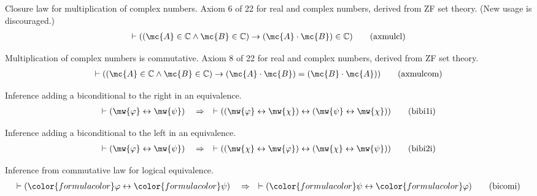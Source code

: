 \begin{lemma} {Closure law for multiplication of complex
numbers.}  Axiom 6 of 22 for
       real and complex numbers, derived from ZF set theory.  
       (New usage is discouraged.)
\begin{align}
\vdash ( ( \mc{A} \in \mathbb{C} \wedge \mc{B} \in \mathbb{C} ) \rightarrow ( \mc{A} \cdot \mc{B} )
    \in \mathbb{C} )\label{eq:axmulcl}\tag{axmulcl}
\end{align}
\end{lemma}


\begin{lemma} {Multiplication of complex numbers is
commutative.}  Axiom 8 of 22 for
       real and complex numbers, derived from ZF set theory.  
\begin{align}
\vdash ( ( \mc{A} \in \mathbb{C} \wedge \mc{B} \in \mathbb{C} ) \rightarrow ( \mc{A} \cdot \mc{B} )
    = ( \mc{B} \cdot \mc{A} ) )\label{eq:axmulcom}\tag{axmulcom}
\end{align}
\end{lemma}


\begin{lemma} {Inference adding a biconditional to the
right in an equivalence.}
\begin{align}
\vdash ( \mw{\varphi} \leftrightarrow \mw{\psi} )\quad\Rightarrow\quad \vdash ( ( \mw{\varphi}
    \leftrightarrow \mw{\chi} ) \leftrightarrow ( \mw{\psi} \leftrightarrow \mw{\chi} )
    )\label{eq:bibi1i}\tag{bibi1i}
\end{align}
\end{lemma}


\begin{lemma} {Inference adding a biconditional to the left
in an equivalence.}
\begin{align}
\vdash ( \mw{\varphi} \leftrightarrow \mw{\psi} )\quad\Rightarrow\quad \vdash (
    ( \mw{\chi} \leftrightarrow \mw{\varphi} ) \leftrightarrow ( \mw{\chi}
    \leftrightarrow \mw{\psi} ) )\label{eq:bibi2i}\tag{bibi2i}
\end{align}
\end{lemma}


\begin{lemma} {Inference from commutative law for logical
equivalence.} 
\begin{align}
\vdash ( {\color{formulacolor}\varphi} \leftrightarrow
    {\color{formulacolor}\psi} )\quad\Rightarrow\quad \vdash (
    {\color{formulacolor}\psi} \leftrightarrow {\color{formulacolor}\varphi}
    )\label{eq:bicomi}\tag{bicomi}
\end{align}
\end{lemma}


